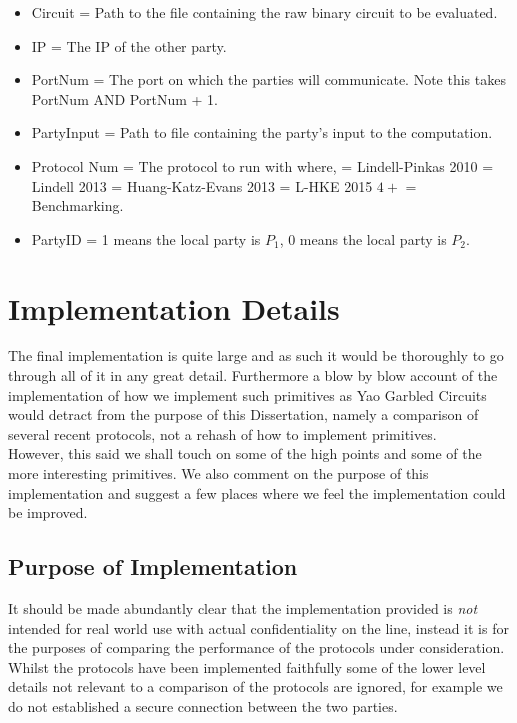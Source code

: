 \documentclass[ %
                    author={Nicholas Tutte},
                supervisor={Prof. Nigel Smart},
                    degree={MEng},
                     title={Secure Two Party Computation},
                  subtitle={A practical comparison of recent protocols},
                      type={Research - GG1K},
                      year={2015} ]{dissertation}
\begin{document}
\begin{appendices}
				\begin{itemize}
					\item Circuit = Path to the file containing the raw binary circuit to be evaluated.
					\item IP = The IP of the other party.
					\item PortNum = The port on which the parties will communicate. Note this takes PortNum AND PortNum + 1.
					\item PartyInput = Path to file containing the party's input to the computation.
					\item Protocol Num = The protocol to run with where,
						 = Lindell-Pinkas 2010
						 = Lindell 2013
						 = Huang-Katz-Evans 2013
						 = L-HKE 2015
						\subitem $4+$ = Benchmarking.
					\item PartyID = 1 means the local party is $P_1$, 0 means the local party is $P_2$.
				\end{itemize}


		\chapter{Implementation Details} \label{sec:ImplementationDetails}
			The final implementation is quite large and as such it would be thoroughly to go through all of it in any great detail. Furthermore a blow by blow account of the implementation of how we implement such primitives as Yao Garbled Circuits would detract from the purpose of this Dissertation, namely a comparison of several recent protocols, not a rehash of how to implement primitives.\\

			However, this said we shall touch on some of the high points and some of the more interesting primitives. We also comment on the purpose of this implementation and suggest a few places where we feel the implementation could be improved.

			\section*{Purpose of Implementation}
				It should be made abundantly clear that the implementation provided is \emph{not} intended for real world use with actual confidentiality on the line, instead it is for the purposes of comparing the performance of the protocols under consideration.\\

				Whilst the protocols have been implemented faithfully some of the lower level details not relevant to a comparison of the protocols are ignored, for example we do not established a secure connection between the two parties.\\


\end{appendices}
\end{document}
